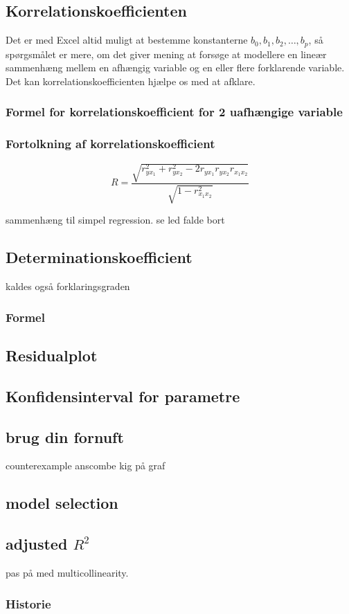 \subsection{Korrelationskoefficienten}
Det er med Excel altid muligt at bestemme konstanterne \(b_0,b_1,b_2,\ldots,b_p\), så spørgsmålet er mere, om det giver mening at forsøge at modellere en lineær sammenhæng mellem en afhængig variable og en eller flere forklarende variable. Det kan korrelationskoefficienten hjælpe os med at afklare.



\subsubsection{Formel for korrelationskoefficient for 2 uafhængige variable}

\subsubsection{Fortolkning af korrelationskoefficient}

\begin{displaymath}
  R = \frac{\sqrt{r^2_{yx_1} + r^2_{yx_2} - 2r_{yx_1} r_{yx_2} r_{{x_1}x_2}}}{\sqrt{1 - r^2_{{x_1}x_2}}}
\end{displaymath}

sammenhæng til simpel regression. se led falde bort

\subsection{Determinationskoefficient}

kaldes også forklaringsgraden

\subsubsection{Formel}


\subsection{Residualplot}


\subsection{Konfidensinterval for parametre}




\subsection{brug din fornuft}
counterexample
anscombe
kig på graf

\subsection{model selection}

\subsection{adjusted \(R^2\)}


pas på med multicollinearity.

\subsubsection{Historie}


